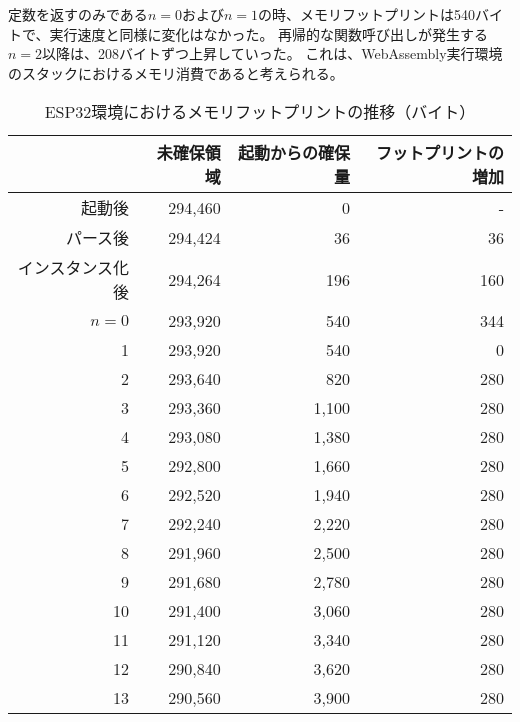 定数を返すのみである$n=0$および$n=1$の時、メモリフットプリントは540バイトで、実行速度と同様に変化はなかった。
再帰的な関数呼び出しが発生する$n=2$以降は、208バイトずつ上昇していった。
これは、WebAssembly実行環境のスタックにおけるメモリ消費であると考えられる。

\begin{table}[htbp]
  \caption{ESP32環境におけるメモリフットプリントの推移（バイト）}
  \label{tab:heap_size}
  \begin{center}
    \begin{tabular}{|r|r|r|r|}
      \hline
      & 未確保領域 & 起動からの確保量 & フットプリントの増加 \\ \hline
      起動後      & 294,460 & 0 & - \\ \hline
      パース後     & 294,424 & 36 & 36 \\ \hline
      インスタンス化後 & 294,264  & 196 & 160 \\ \hline
      $n=0$  & 293,920 &   540 & 344 \\ \hline
          1  & 293,920 &   540 &   0 \\ \hline
          2  & 293,640 &   820 & 280 \\ \hline
          3  & 293,360 & 1,100 & 280 \\ \hline
          4  & 293,080 & 1,380 & 280 \\ \hline
          5  & 292,800 & 1,660 & 280 \\ \hline
          6  & 292,520 & 1,940 & 280 \\ \hline
          7  & 292,240 & 2,220 & 280 \\ \hline
          8  & 291,960 & 2,500 & 280 \\ \hline
          9  & 291,680 & 2,780 & 280 \\ \hline
          10 & 291,400 & 3,060 & 280 \\ \hline
          11 & 291,120 & 3,340 & 280 \\ \hline
          12 & 290,840 & 3,620 & 280 \\ \hline
          13 & 290,560 & 3,900 & 280 \\ \hline
    \end{tabular}
  \end{center}
\end{table}
